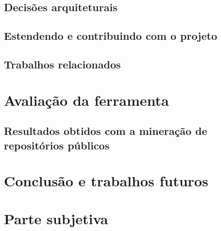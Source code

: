 \documentclass[a4paper, 12pt, twoside]{book}
\begin{document}
    \section{Decisões arquiteturais}
    
    \section{Estendendo e contribuindo com o projeto}
    
    \section{Trabalhos relacionados}
    
\chapter{Avaliação da ferramenta}

    \section{Resultados obtidos com a mineração de repositórios públicos}

\chapter{Conclusão e trabalhos futuros}

\chapter{Parte subjetiva}
\end{document}
